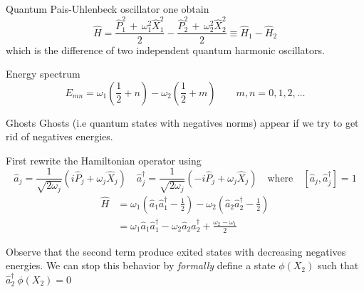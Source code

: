 \begin{frame}{Quantum Pais-Uhlenbeck oscillator}
  one obtain
  \begin{equation*}
    \hat{H} =
    \frac{\hat{P}_1^2 \, + \, \omega_1^2 \hat{X}_1^2}{2} -
    \frac{\hat{P}_2^2 \, + \, \omega_2^2 \hat{X}_2^2}{2} \equiv
    \hat{H}_1 - \hat{H}_2
  \end{equation*}
  which is the difference of two independent quantum harmonic oscillators.
  \vspace{1.5em}
  \begin{block}{Energy spectrum}
    \begin{equation*}
      E_{mn} =
      \omega_1 \left( \frac{1}{2} + n \right) -
      \omega_2 \left( \frac{1}{2} + m \right)
      \qquad m,n = 0,1,2,\ldots
    \end{equation*}
  \end{block}
\end{frame}

\begin{frame}{Ghosts}
  Ghosts (i.e quantum states with negatives norms) appear if we try to get rid
  of negatives energies.

  First rewrite the Hamiltonian operator using
  \begin{equation*}
    \hat{a}_j = \frac{1}{\sqrt{2\omega_j}}
      \left(i \hat{P}_j + \omega_j \hat{X}_j\right) \quad
    \hat{a}_j^{\dagger} = \frac{1}{\sqrt{2\omega_j}}
      \left(-i \hat{P}_j + \omega_j \hat{X}_j\right)
    \quad \text{where} \quad
    \left[ \hat{a}_j, \hat{a}_j^{\dagger} \right] = 1
  \end{equation*}
  \begin{align*}
    \hat{H} &=
      \omega_1 \left( \hat{a}_1 \hat{a}_1^{\dagger} - \frac{1}{2} \right) -
      \omega_2 \left( \hat{a}_2 \hat{a}_2^{\dagger} - \frac{1}{2} \right) \\
            &=
      \omega_1 \hat{a}_1 \hat{a}_1^{\dagger} -
      \omega_2 \hat{a}_2 \hat{a}_2^{\dagger} +
      \frac{\omega_2 - \omega_1}{2}
  \end{align*}

  Observe that the second term produce exited states with decreasing negatives
  energies. We can stop this behavior by \emph{formally} define a state
  $\phi(X_2)$ such that $\hat{a}_2^{\dagger} \ \phi(X_2) = 0$
\end{frame}

